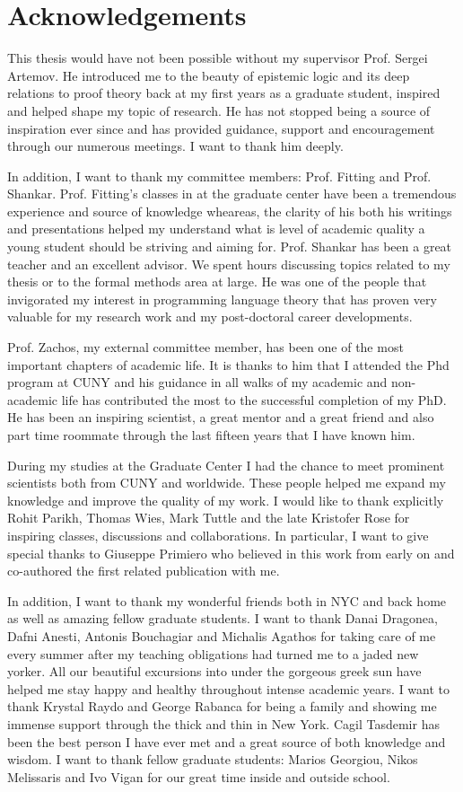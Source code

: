 \section*{Acknowledgements}
This thesis would have not been possible without my supervisor Prof. Sergei Artemov.
He introduced me to the beauty of epistemic logic and its deep relations to proof theory
back at my first years as a graduate student, inspired and helped shape my topic of research. 
He has not stopped being a source of inspiration ever
since and has provided guidance, support and encouragement through our numerous meetings. 
I want to thank him deeply.

In addition, I want to thank my committee members: Prof. Fitting and Prof. Shankar. Prof. Fitting's classes
in at the graduate center have been a tremendous experience and source of knowledge wheareas,
the clarity of his both his writings and presentations helped my understand what is 
level of academic quality a young student should be striving and aiming for. Prof. Shankar has
been a great teacher and an excellent advisor. We spent hours 
discussing topics related to my thesis or to the formal methods area at large. He was one
of the people that invigorated my interest in programming language theory that has
proven very valuable for my research work and my post-doctoral career developments.

Prof. Zachos, my external committee member, has been one of the most important
chapters of academic life. It is thanks to him that I attended the Phd program at CUNY
and his guidance in all walks of my academic and non-academic life has contributed 
the most  to the successful completion of my PhD. He has been an inspiring
scientist, a great mentor and a great friend and also part time roommate through the last fifteen years that I have 
known him. 

During my studies at the Graduate Center I had the chance to meet 
prominent scientists both from CUNY and worldwide. 
These people helped me expand my knowledge and improve
the quality of my work. I would like to thank explicitly Rohit Parikh, Thomas Wies,  
 Mark Tuttle and the late Kristofer Rose for inspiring classes, discussions and collaborations.
In particular, I want to give special thanks to Giuseppe Primiero who believed in this work
from early on and co-authored the first related publication with me.

In addition, I want to thank my wonderful friends both in NYC and back home as well as 
amazing fellow graduate students. I want to thank Danai Dragonea, Dafni Anesti, Antonis Bouchagiar 
and Michalis Agathos for taking care of me every summer after my teaching obligations
had turned me to a jaded new yorker. All our beautiful excursions into under the gorgeous
greek sun have helped me stay happy and healthy throughout intense academic years.
I want to thank Krystal Raydo and George Rabanca for being a family and showing me immense support
through the thick and thin in New York. 
Cagil Tasdemir has been the best person I have ever met and a great source of both knowledge and wisdom.
I want to thank fellow graduate students: Marios Georgiou,
Nikos Melissaris and Ivo Vigan for our great time inside and outside school.

